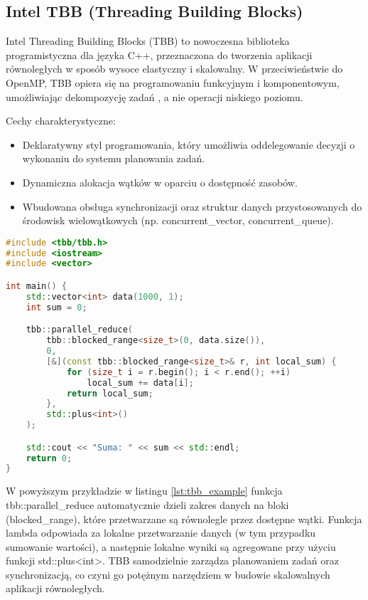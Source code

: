 \subsection{Intel TBB (Threading Building Blocks)}
Intel Threading Building Blocks (TBB) to nowoczesna biblioteka programistyczna dla języka C++, przeznaczona do tworzenia aplikacji równoległych w sposób wysoce elastyczny i skalowalny. W przeciwieństwie do OpenMP, TBB opiera się na programowaniu funkcyjnym i komponentowym, umożliwiając dekompozycję zadań , a nie operacji niskiego poziomu.

Cechy charakterystyczne:
\begin{itemize}
    \item Deklaratywny styl programowania, który umożliwia oddelegowanie decyzji o wykonaniu do systemu planowania zadań.
    \item Dynamiczna alokacja wątków w oparciu o dostępność zasobów.
    \item Wbudowana obsługa synchronizacji oraz struktur danych przystosowanych do środowisk wielowątkowych (np. concurrent\_vector, concurrent\_queue).
\end{itemize}

\begin{lstlisting}[language=C++, caption={Przykład użycia Intel TBB w C++}, label={lst:tbb_example}]
#include <tbb/tbb.h>
#include <iostream>
#include <vector>

int main() {
    std::vector<int> data(1000, 1);
    int sum = 0;

    tbb::parallel_reduce(
        tbb::blocked_range<size_t>(0, data.size()),
        0,
        [&](const tbb::blocked_range<size_t>& r, int local_sum) {
            for (size_t i = r.begin(); i < r.end(); ++i)
                local_sum += data[i];
            return local_sum;
        },
        std::plus<int>()
    );

    std::cout << "Suma: " << sum << std::endl;
    return 0;
}
\end{lstlisting}
W powyższym przykładzie w listingu \ref{lst:tbb_example} funkcja tbb::parallel\_reduce automatycznie dzieli zakres danych na bloki (blocked\_range), które przetwarzane są równolegle przez dostępne wątki. Funkcja lambda odpowiada za lokalne przetwarzanie danych (w tym przypadku sumowanie wartości), a następnie lokalne wyniki są agregowane przy użyciu funkcji std::plus<int>. TBB samodzielnie zarządza planowaniem zadań oraz synchronizacją, co czyni go potężnym narzędziem w budowie skalowalnych aplikacji równoległych.

